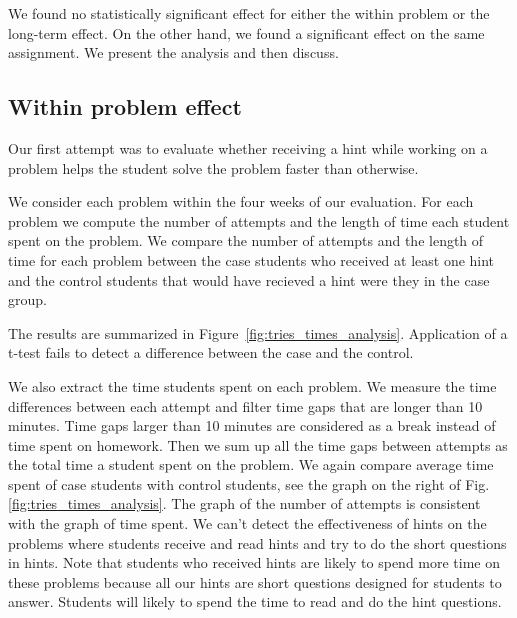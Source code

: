 \documentclass{llncs}
\begin{document}
We found no statistically significant effect for either the within problem or
the long-term effect. On the other hand, we found a significant effect
on the same assignment. We present the analysis and then discuss.

\subsection{Within problem effect}

Our first attempt was to evaluate whether receiving a hint while
working on a problem helps the student solve the problem faster than
otherwise.

We consider each problem within the four weeks of our evaluation. For
each problem we compute the number of attempts and the length of time
each student spent on the problem. We compare the number of attempts
and the length of time for each problem between the case students who
received at least one hint and the control students
that would have recieved a hint were they in the case group.

The results are summarized in
Figure~\ref{fig:tries_times_analysis}. Application of a t-test fails
to detect a difference between the case and the control.

\iffalse
We also extract the time students spent on each problem. We measure the time differences between each attempt and filter time gaps that are longer than 10 minutes. Time gaps larger than 10 minutes are considered as a break instead of time spent on homework. Then we sum up all the time gaps between attempts as the total time a student spent on the problem. We again compare average time spent of case students with control students, see the graph on the right of Fig. \ref{fig:tries_times_analysis}. The graph of the number of attempts is consistent with the graph of time spent. We can't detect the effectiveness of hints on the problems where students receive and read hints and try to do the short questions in hints. Note that students who received hints are likely to spend more time on these problems because all our hints are short questions designed for students to answer. Students will likely to spend the time to read and do the hint questions.
\end{document}
